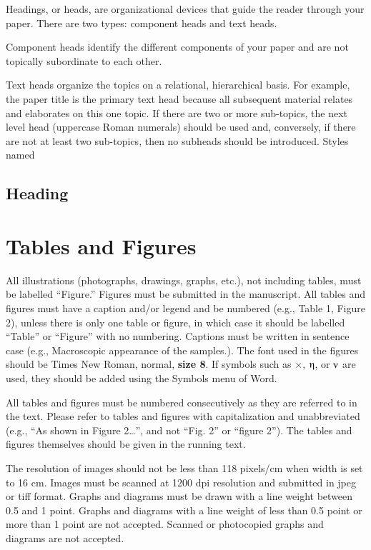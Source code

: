 \documentclass{article} %
\begin{document}
\begin{multicols}{2}
Headings, or heads, are organizational devices that guide the reader through your paper. There are two types: component heads and text heads.

Component heads identify the different components of your paper and are not topically subordinate to each other. 

\noindent Text heads organize the topics on a relational, hierarchical basis. For example, the paper title is the primary text head because all subsequent material relates and elaborates on this one topic. If there are two or more sub-topics, the next level head (uppercase Roman numerals) should be used and, conversely, if there are not at least two sub-topics, then no subheads should be introduced. Styles named 


\subsection{ Heading}


\section{ Tables and Figures}

\noindent All illustrations (photographs, drawings, graphs, etc.), not including tables, must be labelled ``Figure.'' Figures must be submitted in the manuscript. All tables and figures must have a caption and/or legend and be numbered (e.g., Table 1, Figure 2), unless there is only one table or figure, in which case it should be labelled ``Table'' or ``Figure'' with no numbering. Captions must be written in sentence case (e.g., Macroscopic appearance of the samples.). The font used in the figures should be Times New Roman, normal, \textbf{size 8}. If symbols such as $\times$,  $\etaup$, or $\nuup$ are used, they should be added using the Symbols menu of Word. \par
All tables and figures must be numbered consecutively as they are referred to in the text. Please refer to tables and figures with capitalization and unabbreviated (e.g., ``As shown in Figure 2{\dots}'', and not ``Fig. 2'' or ``figure 2''). The tables and figures themselves should be given in the running text. \par

The resolution of images should not be less than 118 pixels/cm when width is set to 16 cm. Images must be scanned at 1200 dpi resolution and submitted in jpeg or tiff format. Graphs and diagrams must be drawn with a line weight between 0.5 and 1 point. Graphs and diagrams with a line weight of less than 0.5 point or more than 1 point are not accepted. Scanned or photocopied graphs and diagrams are not accepted. \par


\end{multicols}
\end{document}
